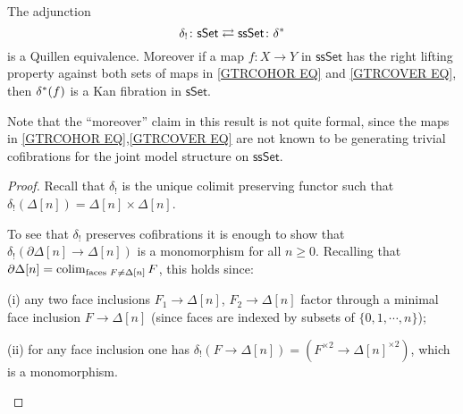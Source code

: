 \documentclass[a4paper,10pt
]{article}%
\begin{document}
\begin{corollary}\label{SSETSSETADJ COR}
	The adjunction
\[
	\delta_{!}\colon \mathsf{sSet} 
		\rightleftarrows 
	\mathsf{ssSet} \colon \delta^{\**}
\]
is a Quillen equivalence.
Moreover if a map $f\colon X \to Y$ in $\mathsf{ssSet}$ has the right lifting property
against both sets of maps in
\eqref{GTRCOHOR EQ} and \eqref{GTRCOVER EQ}, then
$\delta^{\**} (f)$ is a Kan fibration in $\mathsf{sSet}$.
\end{corollary}

Note that the ``moreover'' claim in this result is not quite formal, since the maps in \eqref{GTRCOHOR EQ},\eqref{GTRCOVER EQ} are not known to be generating trivial cofibrations for the joint model structure on $\mathsf{ssSet}$.


\begin{proof}
	Recall that $\delta_!$ is the unique colimit preserving functor such that 
	$\delta_!(\Delta[n])=\Delta[n] \times \Delta[n]$.

	To see that $\delta_!$ preserves cofibrations 
	it is enough to show that 
	$\delta_{!}\left( \partial \Delta[n] \to \Delta[n]\right)$
	is a monomorphism for all $n\geq 0$.
	Recalling that 
	$\partial \Delta[n] = \mathop{\operatorname{colim}}_{\text{faces }F \neq \Delta[n]}F$,
	this holds since:
\begin{inparaenum}
	\item[(i)] any two face inclusions $F_1 \to \Delta[n]$, $F_2 \to \Delta[n]$ factor through a minimal face inclusion $F \to \Delta[n]$ (since faces are indexed by subsets of $\{0,1,\cdots,n\}$); 
	\item[(ii)] for any face inclusion one has 
		$\delta_{!}\left( F \to \Delta[n]\right) = 
		\left(F^{\times 2} \to \Delta[n]^{\times 2} \right)$, which is a monomorphism.
\end{inparaenum}


\end{proof}
\end{document}
